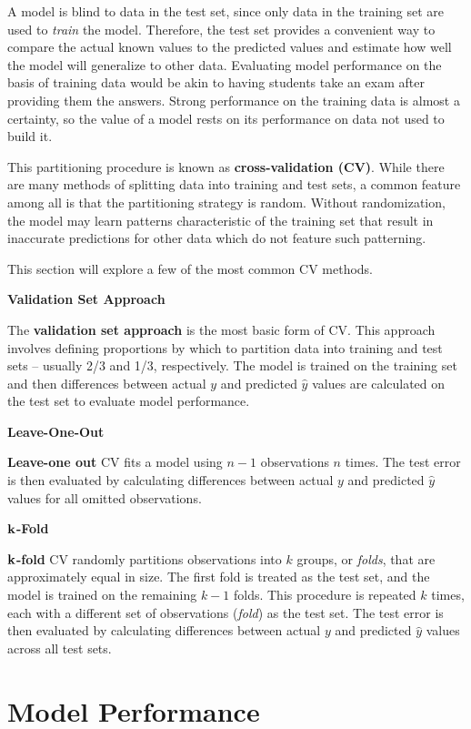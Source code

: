 \documentclass[
]{book}
\begin{document}
A model is blind to data in the test set, since only data in the training set are used to \emph{train} the model. Therefore, the test set provides a convenient way to compare the actual known values to the predicted values and estimate how well the model will generalize to other data. Evaluating model performance on the basis of training data would be akin to having students take an exam after providing them the answers. Strong performance on the training data is almost a certainty, so the value of a model rests on its performance on data not used to build it.

This partitioning procedure is known as \textbf{cross-validation (CV)}. While there are many methods of splitting data into training and test sets, a common feature among all is that the partitioning strategy is random. Without randomization, the model may learn patterns characteristic of the training set that result in inaccurate predictions for other data which do not feature such patterning.

This section will explore a few of the most common CV methods.

\textbf{Validation Set Approach}

The \textbf{validation set approach} is the most basic form of CV. This approach involves defining proportions by which to partition data into training and test sets -- usually 2/3 and 1/3, respectively. The model is trained on the training set and then differences between actual \(y\) and predicted \(\hat y\) values are calculated on the test set to evaluate model performance.

\textbf{Leave-One-Out}

\textbf{Leave-one out} CV fits a model using \(n-1\) observations \(n\) times. The test error is then evaluated by calculating differences between actual \(y\) and predicted \(\hat y\) values for all omitted observations.

\(\textbf k\)\textbf{-Fold}

\(\textbf k\)\textbf{-fold} CV randomly partitions observations into \(k\) groups, or \emph{folds}, that are approximately equal in size. The first fold is treated as the test set, and the model is trained on the remaining \(k-1\) folds. This procedure is repeated \(k\) times, each with a different set of observations (\emph{fold}) as the test set. The test error is then evaluated by calculating differences between actual \(y\) and predicted \(\hat y\) values across all test sets.

\hypertarget{model-performance}{%
\section{Model Performance}\label{model-performance}}
\end{document}
